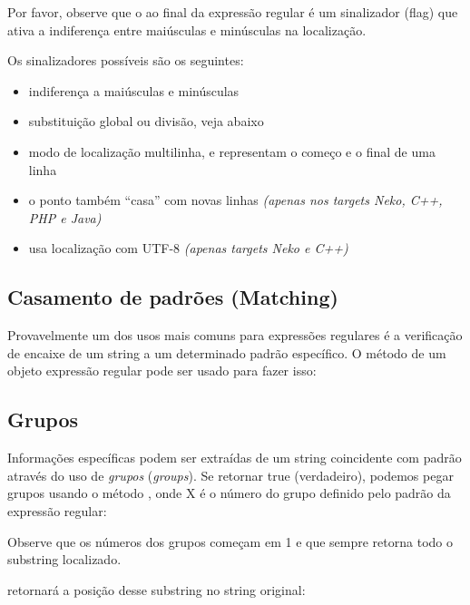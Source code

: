 {Por favor, observe que o  ao final da expressão regular é um sinalizador (flag) que ativa a indiferença entre maiúsculas e minúsculas na localização.

Os sinalizadores possíveis são os seguintes:
\begin{itemize}
    \item {}indiferença a maiúsculas e minúsculas
    \item {} substituição global ou divisão, veja abaixo
    \item {} modo de localização multilinha,\expr{\textasciicircum} e \expr{\$}  representam o começo e o final de uma linha
    \item {} o ponto  também ``casa'' com novas linhas \emph{ (apenas nos targets Neko, C++, PHP e Java)}
    \item {} usa localização com UTF-8 \emph{(apenas targets Neko e C++)}
\end{itemize}

\subsection{Casamento de padrões (Matching)}
\label{std-regex-match}

Provavelmente um dos usos mais comuns para expressões regulares é a verificação de encaixe de um string a um determinado padrão específico. O método  de um objeto expressão regular pode ser usado para fazer isso:


\subsection{Grupos}
\label{std-regex-groups}

Informações específicas podem ser extraídas de um string coincidente com padrão através do uso de \emph{grupos} (\emph{groups}). Se  retornar true (verdadeiro), podemos pegar grupos usando o método , onde X é o número do grupo definido pelo padrão da expressão regular:


Observe que os números dos grupos começam em 1 e que  sempre retorna todo o substring localizado.

 retornará a posição desse substring no string original:


}
